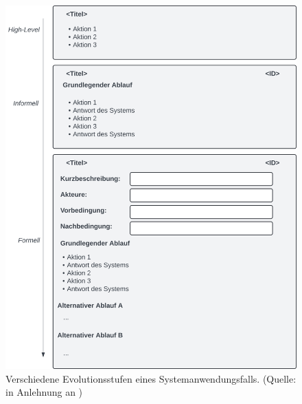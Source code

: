 \begin{figure}
    \centering
    \includegraphics[scale=0.4]{chapters/Anhang/CheatSheets/img/systemusecase}
    \caption{Verschiedene Evolutionsstufen eines Systemanwendungsfalls. (Quelle: in Anlehnung an \cite[Abb. 4.6, 4.7, 4.8]{Wed09})}
    \label{fig:systemusecase}
\end{figure}